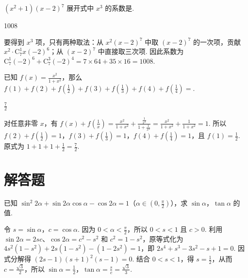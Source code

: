 \begin{problem}
\((x^{2} + 1)(x - 2)^{7}\) 展开式中 \(x^{3}\) 的系数是\fillinblank{}.
\end{problem}

\begin{answer}
1008
\end{answer}

\begin{solution}
要得到 \(x^3\) 项，只有两种取法：从 \(x^2(x-2)^7\) 中取 \((x-2)^7\) 的一次项，贡献 \(\displaystyle x^2\cdot\mathrm C_7^1x(-2)^6\)；从 \((x-2)^7\) 中直接取三次项. 因此系数为
\(\displaystyle\mathrm C_7^1(-2)^6+\mathrm C_7^3(-2)^4=7\times64+35\times16=1008\).
\end{solution}

\begin{problem}
已知 \( f(x)=\frac{x^{2}}{1+x^{2}} \)，那么 \( f(1)+f(2)+f\left(\frac{1}{2}\right)+f(3)+f\left(\frac{1}{3}\right)+f(4)+f\left(\frac{1}{4}\right)= \)\fillinblank{}.
\end{problem}

\begin{answer}
\(\frac{7}{2}\)
\end{answer}

\begin{solution}
对任意非零 \(x\)，有
\(\displaystyle f(x)+f\left(\frac1x\right)=\frac{x^2}{1+x^2}+\frac{\frac{1}{x^2}}{1+\frac{1}{x^2}}=\frac{x^2}{1+x^2}+\frac1{1+x^2}=1\). 所以 \(f(2)+f\left(\frac12\right)=1\)，\(f(3)+f\left(\frac13\right)=1\)，\(f(4)+f\left(\frac14\right)=1\)，且 \(f(1)=\frac12\). 原式为 \(1+1+1+\frac12=\frac72\).
\end{solution}

\section{解答题}
\begin{problem}
已知 \(\sin^2 2\alpha + \sin 2\alpha \cos \alpha - \cos 2\alpha = 1\)（\(\alpha \in \left(0, \frac{\pi}{2}\right)\)），求 \(\sin \alpha\)，\(\tan \alpha\) 的值.
\end{problem}

\begin{solution}
令 \(s=\sin\alpha\)，\(c=\cos\alpha\). 因为 \(0<\alpha<\frac{\pi}{2}\)，所以 \(0<s<1\) 且 \(c>0\). 利用 \(\sin2\alpha=2sc\)、\(\cos2\alpha=c^2-s^2\) 和 \(c^2=1-s^2\)，原等式化为
\(\displaystyle4s^2(1-s^2)+2s(1-s^2)-(1-2s^2)=1\)，即 \(\displaystyle2s^4+s^3-3s^2-s+1=0\). 因式分解得 \(\displaystyle(2s-1)(s+1)^2(s-1)=0\). 结合 \(0<s<1\)，得 \(s=\frac12\)，从而 \(c=\frac{\sqrt3}{2}\)，所以 \(\sin\alpha=\frac12\)，\(\tan\alpha=\frac{s}{c}=\frac{\sqrt3}{3}\).
\end{solution}

